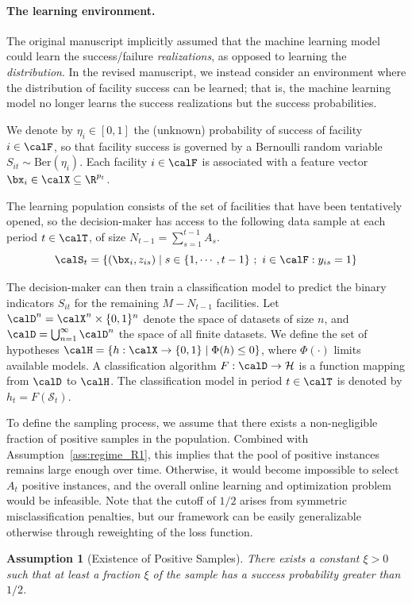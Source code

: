 \documentclass[11pt]{article}
\newtheorem{assumption}{Assumption}[]
\begin{document}
\paragraph{The learning environment.}
The original manuscript implicitly assumed that the machine learning model could learn the success/failure \textit{realizations}, as opposed to learning the \textit{distribution}. In the revised manuscript, we instead consider an environment where the distribution of facility success can be learned; that is, the machine learning model no longer learns the success realizations but the success probabilities.

We denote by $\eta_{i} \in [0,1]$ the (unknown) probability of success of facility $i\in\calF$, so that facility success is governed by a Bernoulli random variable $S_{it}\sim \text{Ber}(\eta_{i})$. Each facility $i\in\calF$ is associated with a feature vector $\bx_{i} \in \calX\subseteq\R^{p_t}$.

The learning population consists of the set of facilities that have been tentatively opened, so the decision-maker has access to the following data sample at each period $t\in\calT$, of size $N_{t-1}=\sum_{s=1}^{t-1}A_s$.
$$\calS_t=\left\{(\bx_{i},z_{is})\mid s\in\{1,\cdots,t-1\}\ ;\ i\in\calF:y_{is}=1\right\}$$

The decision-maker can then train a classification model to predict the binary indicators $S_{it}$ for the remaining $M-N_{t-1}$ facilities. Let $\calD^n = \calX^n\times\{0,1\}^n$ denote the space of datasets of size $n$, and $\calD = \bigcup_{n=1}^\infty \calD^n$ the space of all finite datasets. We define the set of hypotheses $\calH = \{h: \calX \to \{0,1\} \mid \Phi(h) \leq 0\}$, where $\Phi(\cdot)$ limits available models. A classification algorithm $F: \calD \to \mathcal{H}$ is a function mapping from $ \calD$ to $\calH$. The classification model in period $t\in\calT$ is denoted by $h_t = F(\mathcal{S}_t)$.

To define the sampling process, we assume that there exists a non-negligible fraction of positive samples in the population. Combined with Assumption~\ref{ass:regime_R1}, this implies that the pool of positive instances remains large enough over time. Otherwise, it would become impossible to select $A_t$ positive instances, and the overall online learning and optimization problem would be infeasible. Note that the cutoff of $1/2$ arises from symmetric misclassification penalties, but our framework can be easily generalizable otherwise through reweighting of the loss function.
\begin{assumption}[Existence of Positive Samples]\label{ass:positive_R1} There exists a constant $\xi > 0$ such that at least a fraction $\xi$ of the sample has a success probability greater than $1/2$.
\end{assumption}
\end{document}
